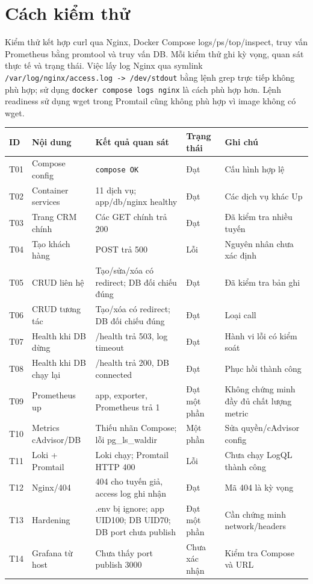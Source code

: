 \documentclass[12pt,a4paper]{report}
\begin{document}
\section{Cách kiểm thử}
Kiểm thử kết hợp curl qua Nginx, Docker Compose logs/ps/top/inspect, truy vấn Prometheus bằng promtool và truy vấn DB. Mỗi kiểm thử ghi kỳ vọng, quan sát thực tế và trạng thái. Việc lấy log Nginx qua symlink \texttt{/var/log/nginx/access.log -> /dev/stdout} bằng lệnh grep trực tiếp không phù hợp; sử dụng \texttt{docker compose logs nginx} là cách phù hợp hơn. Lệnh readiness sử dụng wget trong Promtail cũng không phù hợp vì image không có wget.
\begin{longtable}{p{0.8cm}p{4.2cm}p{3.2cm}p{1.4cm}p{4cm}}
\toprule
ID & Nội dung & Kết quả quan sát & Trạng thái & Ghi chú\\
\midrule
T01 & Compose config & \texttt{compose OK} & Đạt & Cấu hình hợp lệ\\
T02 & Container services & 11 dịch vụ; app/db/nginx healthy & Đạt & Các dịch vụ khác Up\\
T03 & Trang CRM chính & Các GET chính trả 200 & Đạt & Đã kiểm tra nhiều tuyến\\
T04 & Tạo khách hàng & POST trả 500 & Lỗi & Nguyên nhân chưa xác định\\
T05 & CRUD liên hệ & Tạo/sửa/xóa có redirect; DB đối chiếu đúng & Đạt & Đã kiểm tra bản ghi\\
T06 & CRUD tương tác & Tạo/xóa có redirect; DB đối chiếu đúng & Đạt & Loại call\\
T07 & Health khi DB dừng & /health trả 503, log timeout & Đạt & Hành vi lỗi có kiểm soát\\
T08 & Health khi DB chạy lại & /health trả 200, DB connected & Đạt & Phục hồi thành công\\
T09 & Prometheus up & app, exporter, Prometheus trả 1 & Đạt một phần & Không chứng minh đầy đủ chất lượng metric\\
T10 & Metrics cAdvisor/DB & Thiếu nhãn Compose; lỗi pg\_ls\_waldir & Một phần & Sửa quyền/cAdvisor config\\
T11 & Loki + Promtail & Loki chạy; Promtail HTTP 400 & Lỗi & Chưa chạy LogQL thành công\\
T12 & Nginx/404 & 404 cho tuyến giả, access log ghi nhận & Đạt & Mã 404 là kỳ vọng\\
T13 & Hardening & .env bị ignore; app UID100; DB UID70; DB port chưa publish & Đạt một phần & Cần chứng minh network/headers\\
T14 & Grafana từ host & Chưa thấy port publish 3000 & Chưa xác nhận & Kiểm tra Compose và URL\\
\bottomrule
\end{longtable}
\end{document}
